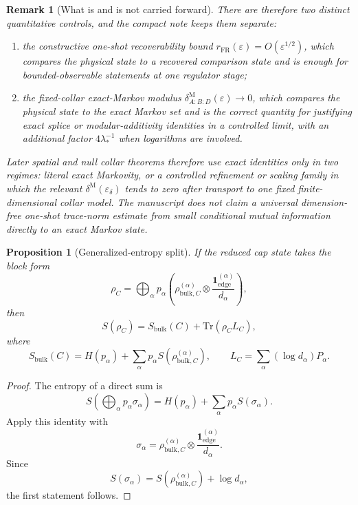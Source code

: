 \documentclass[11pt]{article}
\newtheorem{proposition}[theorem]{Proposition}
\newtheorem{remark}[theorem]{Remark}
\begin{document}
\begin{remark}[What is and is not carried forward]
There are therefore two distinct quantitative controls, and the compact note keeps them separate:
\begin{enumerate}[leftmargin=2em]
\item the constructive one-shot recoverability bound \(r_{\mathrm{FR}}(\varepsilon)=O(\varepsilon^{1/2})\), which compares the physical state to a recovered comparison state and is enough for bounded-observable statements at one regulator stage;
\item the fixed-collar exact-Markov modulus \(\delta^{\mathrm M}_{A:B:D}(\varepsilon)\to 0\), which compares the physical state to the exact Markov set and is the correct quantity for justifying exact splice or modular-additivity identities in a controlled limit, with an additional factor \(4\lambda_\ast^{-1}\) when logarithms are involved.
\end{enumerate}
Later spatial and null collar theorems therefore use exact identities only in two regimes: literal exact Markovity, or a controlled refinement or scaling family in which the relevant \(\delta^{\mathrm M}(\varepsilon_\delta)\) tends to zero after transport to one fixed finite-dimensional collar model. The manuscript does \emph{not} claim a universal dimension-free one-shot trace-norm estimate from small conditional mutual information directly to an exact Markov state.
\end{remark}

\begin{proposition}[Generalized-entropy split]\label{prop:gensplit}
If the reduced cap state takes the block form
\[
\rho_C=
\bigoplus_\alpha p_\alpha
\left(
\rho^{(\alpha)}_{\mathrm{bulk},C}\otimes
\frac{\mathbf 1^{(\alpha)}_{\mathrm{edge}}}{d_\alpha}
\right),
\]
then
\[
S(\rho_C)=S_{\mathrm{bulk}}(C)+\mathrm{Tr}(\rho_C L_C),
\]
where
\[
S_{\mathrm{bulk}}(C)=H(p_\alpha)+\sum_\alpha p_\alpha S(\rho^{(\alpha)}_{\mathrm{bulk},C}),
\qquad
L_C=\sum_\alpha (\log d_\alpha)P_\alpha.
\]
\end{proposition}

\begin{proof}
The entropy of a direct sum is
\[
S\!\left(\bigoplus_\alpha p_\alpha \sigma_\alpha\right)
=
H(p_\alpha)+\sum_\alpha p_\alpha S(\sigma_\alpha).
\]
Apply this identity with
\[
\sigma_\alpha=
\rho^{(\alpha)}_{\mathrm{bulk},C}\otimes
\frac{\mathbf 1^{(\alpha)}_{\mathrm{edge}}}{d_\alpha}.
\]
Since
\[
S(\sigma_\alpha)=S(\rho^{(\alpha)}_{\mathrm{bulk},C})+\log d_\alpha,
\]
the first statement follows.
\end{proof}
\end{document}
